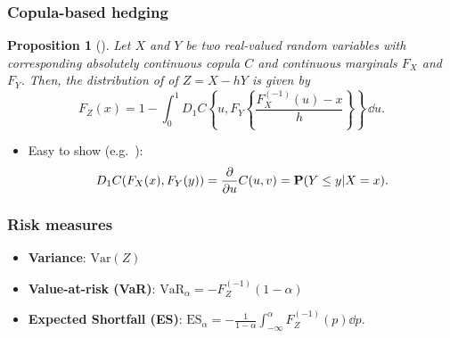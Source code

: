 \documentclass[10pt,mathserif,notes=show]{beamer}
\renewcommand{\(}{\begin{columns}}
\renewcommand{\)}{\end{columns}}
\newcommand{\<}[1]{\begin{column}{#1}}
\renewcommand{\>}{\end{column}}
\newtheorem{proposition}[theorem]{Proposition}
\theoremstyle{definition}
\begin{document}
\begin{frame}
  \frametitle{Copula-based hedging}
  \begin{proposition}[\cite{Barbi2014}]
  \label{prop:dfrh}
  Let $X$ and $Y$ be two real-valued random variables with
  corresponding 
  absolutely continuous copula $C$ and
  continuous marginals $F_X$ and $F_Y$. Then, the distribution
  of of $Z=X - h Y$ is given by
  \begin{equation}
    \label{eq:3}
    F_Z(x) = 1- \int^1_0 D_1 C
    \left\{ u, F_Y \left\{ \frac{F^{(-1)}_X(u)-x}{h} \right\}
    \right\}\, \dd u.
  \end{equation}
\end{proposition}
\begin{itemize}
\item Easy to show (e.g.\ \citet{McNeil2005}):
\begin{equation*}
  D_1 C(F_X(x), F_Y(y)) = \frac{\partial}{\partial u} C(u,v) = {\bf P}(Y\leq y|X=x).
\end{equation*}
\end{itemize}
\end{frame}

\begin{frame}
  \frametitle{Risk measures}
  \begin{itemize}
    \addtolength{\itemsep}{8pt}
  \item {\bf Variance}: $\text{Var}(Z)$
  \item {\bf Value-at-risk (VaR)}: $\text{VaR}_\alpha = -
    F_Z^{(-1)}(1-\alpha)$  
  \item {\bf Expected Shortfall (ES)}: 
    $\displaystyle \text{ES}_\alpha =-
    \frac{1}{1-\alpha}\int_{-\infty}^{\alpha} F_Z^{(-1)}(p) \dd p$.
  \end{itemize}
\end{frame}
\end{document}
